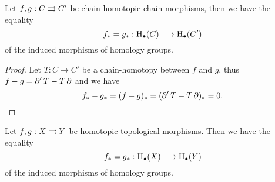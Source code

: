 \begin{proposition}
\label{prop:homotopic-chain-maps-equal-induced-homology-morphisms}
Let \(f, g: C \rightrightarrows C'\) be chain-homotopic chain morphisms, then we have the
equality
\[
f_{*} = g_{*}: \operatorname{H}_{\bullet}(C) \longrightarrow \operatorname{H}_{\bullet}(C')
\]
of the induced morphisms of homology groups.
\end{proposition}

\begin{proof}
Let \(T: C \to C'\) be a chain-homotopy between \(f\) and \(g\), thus \(f - g =
\operatorname{\partial}' T - T \operatorname{\partial}\) and we have
\[
f_{*} - g_{*} = (f - g)_{*} = (\operatorname{\partial}' T - T \operatorname{\partial})_{*} = 0.
\]
\end{proof}

\begin{theorem}
\label{thm:homotopic-maps-equal-induced-homology-morphism}
Let \(f, g: X \rightrightarrows Y\) be homotopic topological morphisms. Then we have the
equality
\[
f_{*} = g_{*}: \operatorname{H}_{\bullet}(X) \longrightarrow \operatorname{H}_{\bullet}(Y)
\]
of the induced morphisms of homology groups.
\end{theorem}

